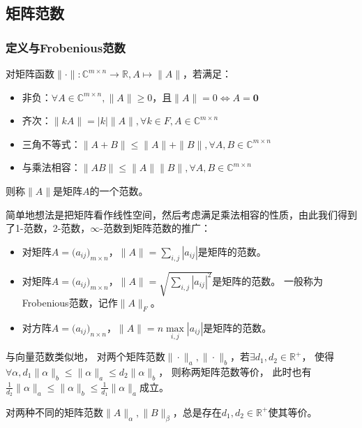 \subsection{矩阵范数}
\subsubsection{定义与Frobenious范数}

\begin{definition}[矩阵范数]
    对矩阵函数$\|\cdot\|:\mathbb{C}^{m\times n}\to \mathbb{R},A\mapsto \|A\|$，若满足：
    \begin{itemize}
        \item 非负：$\forall A\in \mathbb{C}^{m\times n}, \|A\|\geq 0$，且$\|A\|=0\Leftrightarrow A=\bm{0}$
        \item 齐次：$\|kA\|=|k| \|A\|,\forall k\in F, A\in \mathbb{C}^{m\times n}$
        \item 三角不等式：$\|A+B\|\leq \|A\|+\|B\|, \forall A,B \in \mathbb{C}^{m\times n}$
        \item 与乘法相容：$\|AB\|\leq \|A\|\|B\|, \forall A,B \in \mathbb{C}^{m\times n}$
    \end{itemize}
    则称$\|A\|$是矩阵$A$的一个范数。
\end{definition}

简单地想法是把矩阵看作线性空间，然后考虑满足乘法相容的性质，由此我们得到了1-范数，2-范数，$\infty$-范数到矩阵范数的推广：
\begin{itemize}
    \item 对矩阵$A=\Big(a_{ij}\Big)_{m\times n}$，$\|A\|=\sum\limits_{i,j}|a_{ij}|$是矩阵的范数。
    \item 对矩阵$A=\Big(a_{ij}\Big)_{m\times n}$，$\|A\|=\sqrt{\sum\limits_{i,j}|a_{ij}|^2}$是矩阵的范数。
        一般称为Frobenious范数，记作$\|A\|_F$。
    \item 对方阵$A=\Big(a_{ij}\Big)_{n\times n}$，$\|A\|=n \max\limits_{i,j}|a_{ij}|$是矩阵的范数。
\end{itemize}

\begin{definition}
    与向量范数类似地，
    对两个矩阵范数$\|\cdot\|_a,\|\cdot\|_b$，若$\exists d_1,d_2\in \mathbb{R}^{+}$，
    使得$\forall \alpha, d_1 \|\alpha\|_b \leq \|\alpha\|_a \leq d_2 \|\alpha\|_b$，
    则称两矩阵范数等价，
    此时也有$\frac{1}{d_2} \|\alpha\|_a \leq \|\alpha\|_b \leq \frac{1}{d_1} \|\alpha\|_a$成立。
\end{definition}

\begin{theorem}
    对两种不同的矩阵范数$\|A\|_\alpha,\|B\|_\beta$，总是存在$d_1,d_2\in \mathbb{R}^{+}$使其等价。
\end{theorem}

